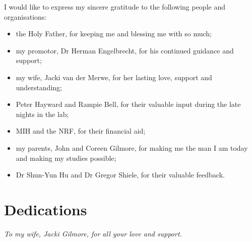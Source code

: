 I would like to express my sincere gratitude to the following people and organisations:
\begin{itemize}
  \item the Holy Father, for keeping me and blessing me with so much;
  \item my promotor, Dr Herman Engelbrecht, for his continued guidance and support;
  \item my wife, Jacki van der Merwe, for her lasting love, support and understanding;
  \item Peter Hayward and Rampie Bell, for their valuable input during the late nights in the lab;
  \item MIH and the NRF, for their financial aid;
  \item my parents, John and Coreen Gilmore, for making me the man I am today and making
  my studies possible;
  \item Dr Shun-Yun Hu and Dr Gregor Shiele, for their valuable feedback.
\end{itemize}


\chapter{Dedications}%
 \vfill
 \begin{center}\itshape
    To my wife, Jacki Gilmore, for all your love and support.
 \end{center}
 \vfill
 \clearpage

\endinput
